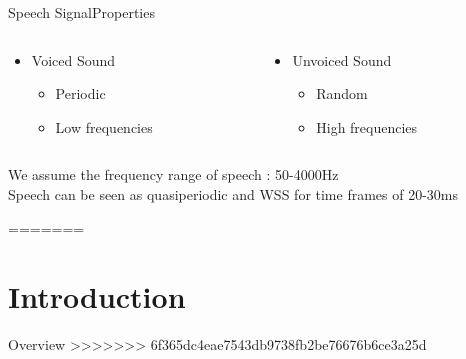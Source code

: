 \begin{frame}{Speech Signal}{Properties}
	\begin{center}
 	\vspace{0.5cm}
	\begin{columns}
		\begin{column}{0.5\textwidth}
		\begin{itemize}		
		\item Voiced Sound
			\begin{itemize}
				\item Periodic 
				\item Low frequencies
			\end{itemize}
		\end{itemize}
		\end{column}
		\begin{column}{0.5\textwidth} 
		\begin{itemize}
		\item Unvoiced Sound 
			\begin{itemize}
				\item Random
				\item High frequencies
			\end{itemize}	
	    \end{itemize}	
		\end{column}
	\end{columns}
	\vspace{1cm}
	We assume the frequency range of speech : 50-4000Hz \\
	Speech can be seen as quasiperiodic and WSS for time frames of 20-30ms 
	\end{center}
=======
\section{Introduction}
\begin{frame}{Overview}
>>>>>>> 6f365dc4eae7543db9738fb2be76676b6ce3a25d
\end{frame}


\end{frame}
